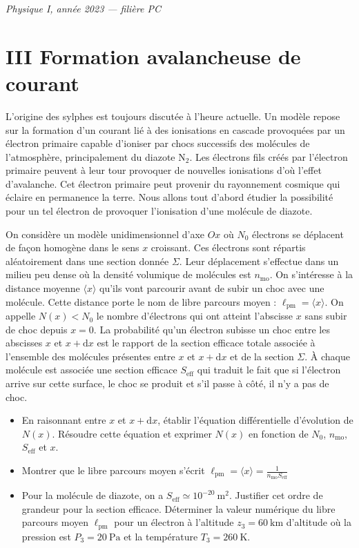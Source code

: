 \textit{Physique I, année 2023 — filière PC}

\section*{III \quad Formation avalancheuse de courant}

L'origine des sylphes est toujours discutée à l'heure actuelle.
Un modèle repose sur la formation d'un courant lié à des ionisations en cascade provoquées par un électron primaire capable d'ioniser par chocs successifs des molécules de l'atmosphère, principalement du diazote $\text{N}_2$.
Les électrons fils créés par l'électron primaire peuvent à leur tour provoquer de nouvelles ionisations d'où l'effet d'avalanche. Cet électron primaire peut provenir du rayonnement cosmique qui éclaire en permanence la terre. Nous allons tout d'abord étudier la possibilité pour un tel électron de provoquer l'ionisation d'une molécule de diazote.

On considère un modèle unidimensionnel d'axe $Ox$ où $N_0$ électrons se déplacent de façon homogène dans le sens $x$ croissant. Ces électrons sont répartis aléatoirement dans une section donnée $\Sigma$. Leur déplacement s'effectue dans un milieu peu dense où la densité volumique de molécules est $n_{\text{mo}}$. On s'intéresse à la distance moyenne $\langle x \rangle$ qu'ils vont parcourir avant de subir un choc avec une molécule. Cette distance porte le nom de libre parcours moyen : $\ell_{\text{pm}} = \langle x \rangle$. On appelle $N(x) < N_0$ le nombre d'électrons qui ont atteint l'abscisse $x$ sans subir de choc depuis $x = 0$. La probabilité qu'un électron subisse un choc entre les abscisses $x$ et $x + \text{d}x$ est le rapport de la section efficace totale associée à l'ensemble des molécules présentes entre $x$ et $x + \text{d}x$ et de la section $\Sigma$. À chaque molécule est associée une section efficace $S_{\text{eff}}$ qui traduit le fait que si l'électron arrive sur cette surface, le choc se produit et s'il passe à côté, il n'y a pas de choc.

\begin{itemize}
    \item[\textbf{18.}] En raisonnant entre $x$ et $x + \text{d}x$, établir l'équation différentielle d'évolution de $N(x)$. Résoudre cette équation et exprimer $N(x)$ en fonction de $N_0$, $n_{\text{mo}}$, $S_{\text{eff}}$ et $x$.
    \item[\textbf{19.}] Montrer que le libre parcours moyen s'écrit $\ell_{\text{pm}} = \langle x \rangle = \frac{1}{n_{\text{mo}} S_{\text{eff}}}$
    \item[\textbf{20.}] Pour la molécule de diazote, on a $S_{\text{eff}} \simeq 10^{-20}\ \text{m}^2$. Justifier cet ordre de grandeur pour la section efficace. Déterminer la valeur numérique du libre parcours moyen $\ell_{\text{pm}}$ pour un électron à l'altitude $z_3 = 60\ \text{km}$ d'altitude où la pression est $P_3 = 20\ \text{Pa}$ et la température $T_3 = 260\ \text{K}$.
\end{itemize}


